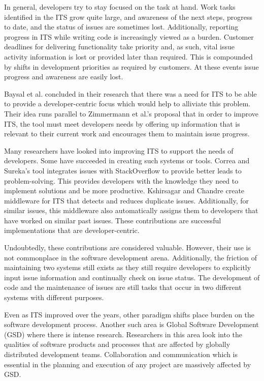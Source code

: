 \documentclass{mproj}
\begin{document}
In general, developers try to stay focused on the task at hand. Work tasks identified in the ITS grow quite large, and awareness of the next steps, progress to date, and the status of issues are sometimes lost. Additionally, reporting progress in ITS while writing code is increasingly viewed as a burden. Customer deadlines for delivering functionality take priority and, as such, vital issue activity information is lost or provided later than required. This is compounded by shifts in development priorities as required by customers. At these events issue progress and awareness are easily lost.

Baysal et al. \cite{Baysal:2013} concluded in their research that there was a need for ITS to be able to provide a developer-centric focus which would help to alliviate this problem. Their  idea runs parallel to Zimmermann et al.'s \cite{Zimmermann:2009} proposal that in order to improve ITS, the tool must meet developers needs by offering up information that is relevant to their current work and encourages them to maintain issue progress.

Many researchers have looked into improving ITS to support the needs of developers. Some have succeeded in creating such systems or tools. Correa and Sureka’s \cite{Correa:2013} tool integrates issues with StackOverflow to provide better leads to problem-solving. This provides developers with the knowledge they need to implement solutions and be more productive. Kshirsagar and Chandre \cite{Kshirsagar:2015} create middleware for ITS that detects and reduces duplicate issues. Additionally, for similar issues, this middleware also automatically assigns them to developers that have worked on similar past issues. These contributions are successful implementations that are developer-centric.

Undoubtedly, these contributions are considered valuable. However, their use is not commonplace in the software development arena. Additionally, the friction of maintaining two systems still exists as they still require developers to explicitly input issue information and continually check on issue status. The development of code and the maintenance of issues are still tasks that occur in two different systems with different purposes.

Even as ITS improved over the years, other paradigm shifts place burden on the software development process. Another such area is Global Software Development (GSD) where there is intense research. Researchers in this area look into the qualities of software products and processes that are affected by globally distributed development teams. Collaboration and communication which is essential in the planning and execution of any project are massively affected by GSD.
\end{document}
